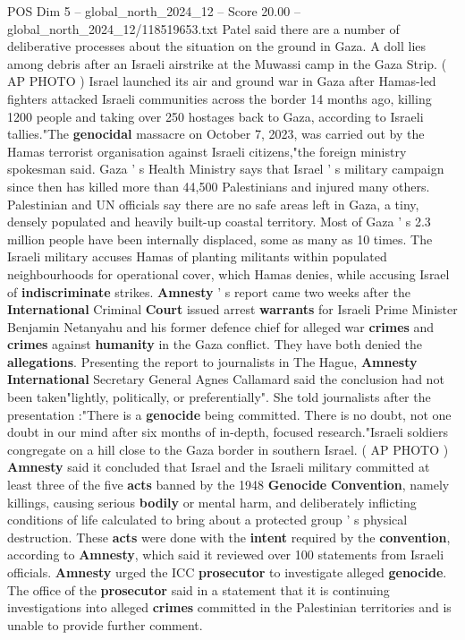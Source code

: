 \begin{textsample}{POS Dim 5 – global\_north\_2024\_12 – Score 20.00 – global\_north\_2024\_12/118519653.txt}
Patel said there are a number of deliberative processes about the situation on the ground in Gaza.
A doll lies among debris after an Israeli airstrike at the Muwassi camp in the Gaza Strip. ( AP PHOTO ) Israel launched its air and ground war in Gaza after Hamas-led fighters attacked Israeli communities across the border 14 months ago, killing 1200 people and taking over 250 hostages back to Gaza, according to Israeli tallies."The \textbf{genocidal} massacre on October 7, 2023, was carried out by the Hamas terrorist organisation against Israeli citizens,"the foreign ministry spokesman said.
Gaza ' s Health Ministry says that Israel ' s military campaign since then has killed more than 44,500 Palestinians and injured many others.
Palestinian and UN officials say there are no safe areas left in Gaza, a tiny, densely populated and heavily built-up coastal territory.
Most of Gaza ' s 2.3 million people have been internally displaced, some as many as 10 times.
The Israeli military accuses Hamas of planting militants within populated neighbourhoods for operational cover, which Hamas denies, while accusing Israel of \textbf{indiscriminate} strikes. \textbf{Amnesty} ' s report came two weeks after the \textbf{International} Criminal \textbf{Court} issued arrest \textbf{warrants} for Israeli Prime Minister Benjamin Netanyahu and his former defence chief for alleged war \textbf{crimes} and \textbf{crimes} against \textbf{humanity} in the Gaza conflict.
They have both denied the \textbf{allegations}.
Presenting the report to journalists in The Hague, \textbf{Amnesty} \textbf{International} Secretary General Agnes Callamard said the conclusion had not been taken"lightly, politically, or preferentially".
She told journalists after the presentation :"There is a \textbf{genocide} being committed.
There is no doubt, not one doubt in our mind after six months of in-depth, focused research."Israeli soldiers congregate on a hill close to the Gaza border in southern Israel. ( AP PHOTO ) \textbf{Amnesty} said it concluded that Israel and the Israeli military committed at least three of the five \textbf{acts} banned by the 1948 \textbf{Genocide} \textbf{Convention}, namely killings, causing serious \textbf{bodily} or mental harm, and deliberately inflicting conditions of life calculated to bring about a protected group ' s physical destruction.
These \textbf{acts} were done with the \textbf{intent} required by the \textbf{convention}, according to \textbf{Amnesty}, which said it reviewed over 100 statements from Israeli officials. \textbf{Amnesty} urged the ICC \textbf{prosecutor} to investigate alleged \textbf{genocide}.
The office of the \textbf{prosecutor} said in a statement that it is continuing investigations into alleged \textbf{crimes} committed in the Palestinian territories and is unable to provide further comment.

\end{textsample}

